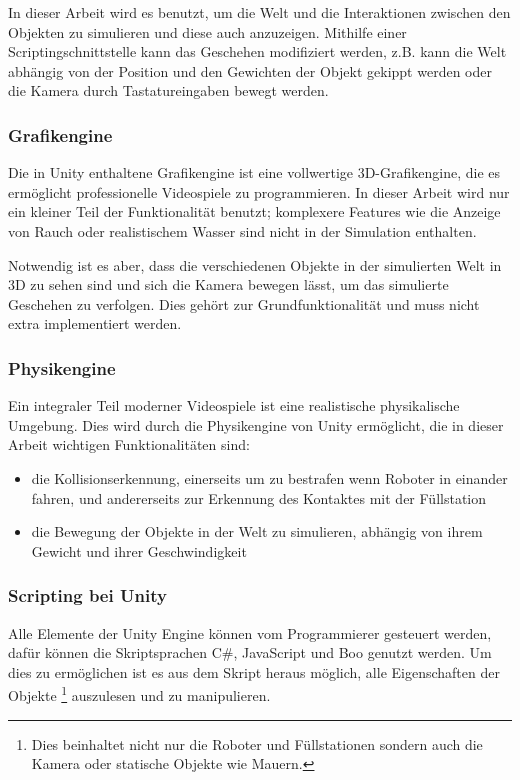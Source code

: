 In dieser Arbeit wird es benutzt, um die Welt und die Interaktionen zwischen den Objekten zu simulieren und diese auch anzuzeigen. Mithilfe einer Scriptingschnittstelle kann das Geschehen modifiziert werden, z.B. kann die Welt
abh{\"{a}}ngig von der Position und den Gewichten der Objekt gekippt werden oder die Kamera durch Tastatureingaben bewegt werden.

\subsubsection{Grafikengine}
Die in Unity enthaltene Grafikengine ist eine vollwertige 3D-Grafikengine, die es erm{\"{o}}glicht professionelle Videospiele zu programmieren. In dieser Arbeit wird nur
ein kleiner Teil der Funktionalit{\"{a}}t benutzt; komplexere Features wie die Anzeige von Rauch oder realistischem Wasser sind nicht in der Simulation enthalten.

Notwendig ist es aber, dass die verschiedenen Objekte in der simulierten Welt in 3D zu sehen sind und sich die Kamera bewegen l{\"{a}}sst, um das simulierte Geschehen zu
verfolgen. Dies geh{\"{o}}rt zur Grundfunktionalit{\"{a}}t und muss nicht extra implementiert werden.

\subsubsection{Physikengine}
Ein integraler Teil moderner Videospiele ist eine realistische physikalische Umgebung. Dies wird durch die Physikengine von Unity erm{\"{o}}glicht, die in dieser Arbeit wichtigen Funktionalit{\"{a}}ten sind:

\begin{itemize}
\item die Kollisionserkennung, einerseits um zu bestrafen wenn Roboter in einander fahren,
	und andererseits zur Erkennung des Kontaktes mit der F{\"{u}}llstation
\item die Bewegung der Objekte in der Welt zu simulieren, abh{\"{a}}ngig von ihrem Gewicht und ihrer Geschwindigkeit
\end{itemize}

\subsubsection{Scripting bei Unity}
Alle Elemente der Unity Engine k{\"{o}}nnen vom Programmierer gesteuert werden, daf{\"{u}}r k{\"{o}}nnen
die Skriptsprachen C\#, JavaScript und Boo genutzt werden.\cite{wiki:unity}
Um dies zu erm{\"{o}}glichen ist es aus dem Skript heraus m{\"{o}}glich, alle Eigenschaften
der Objekte \footnote{Dies beinhaltet nicht nur die Roboter und F{\"{u}}llstationen sondern auch die Kamera
oder statische Objekte wie Mauern.} auszulesen und zu manipulieren.

